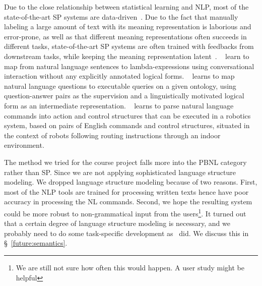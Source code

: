 Due to the close relationship between statistical learning and NLP, most of the state-of-the-art SP systems are data-driven~\cite{Zettlemoyer05learningto,Kwiatkowski:2011:LGC:2145432.2145593,DBLP:Poon13}. Due to the fact that manually labeling a large amount of text with its meaning representation is laborious and error-prone, as well as that different meaning representations often succeeds in different tasks, state-of-the-art SP systems are often trained with feedbacks from downstream tasks, while keeping the meaning representation latent~\cite{Artzi:2011:BSP:2145432.2145481,kwiatkowski-EtAl:2013:EMNLP}. ~\cite{Artzi:2011:BSP:2145432.2145481} learn to map from natural language sentences to lambda-expressions using conversational interaction without any explicitly annotated logical forms.
~\cite{kwiatkowski-EtAl:2013:EMNLP} learns to map natural language questions to executable queries on a given ontology, using question-answer pairs as the supervision and a linguistically motivated logical form as an intermediate representation.
~\cite{conf/iser/MatuszekHZF12} learns to parse natural language commands into action and control structures that can be executed in a robotics system, based on pairs of English commands and control structures, situated in the context of robots following routing instructions through an indoor environment.

The method we tried for the course project falls more into the PBNL category rather than SP. Since we are not applying sophisticated language structure modeling. We dropped language structure modeling because of two reasons. First, most of the NLP tools are trained for processing written texts hence have poor accuracy in processing the NL commands. Second, we hope the resulting system could be more robust to non-grammatical input from the users\footnote{We are still not sure how often this would happen. A user study might be helpful}. It turned out that a certain degree of language structure modeling is necessary, and we probably need to do some task-specific development as~\cite{DBLP:conf/emnlp/KiddonPZC15} did. We discuss this in \S~\ref{future:semantics}.

